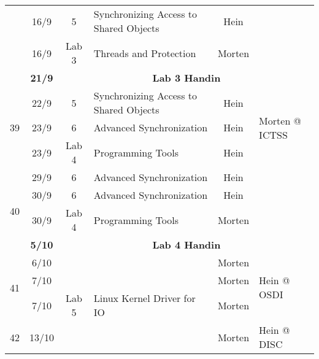 \begin{table}[h]
\begin{tabular}{ccclcl}
                    & 16/9           & 5                & Synchronizing Access to Shared Objects & Hein             &                                 \\
                    & 16/9           & Lab 3            & Threads and Protection                 & Morten           &                                 \\
                    & \textbf{21/9}  & \multicolumn{4}{c}{\textbf{Lab 3 Handin}}                                                                      \\
\multirow{3}{*}{39} & 22/9           & 5                & Synchronizing Access to Shared Objects & Hein             & \multirow{3}{*}{Morten @ ICTSS} \\
                    & 23/9           & 6                & Advanced Synchronization               & Hein             &                                 \\
                    & 23/9           & Lab 4            & Programming Tools                      & Hein             &                                 \\
\multirow{4}{*}{40} & 29/9           & 6                & Advanced Synchronization               & Hein             &                                 \\
                    & 30/9           & 6                & Advanced Synchronization               & Hein             &                                 \\
                    & 30/9           & Lab 4            & Programming Tools                      & Morten           &                                 \\
                    & \textbf{5/10}  & \multicolumn{4}{c}{\textbf{Lab 4 Handin}}                                                                      \\
\multirow{3}{*}{41} & 6/10           &                  &                                        & Morten           & \multirow{3}{*}{Hein @ OSDI}    \\
                    & 7/10           &                  &                                        & Morten           &                                 \\
                    & 7/10           & Lab 5            & Linux Kernel Driver for IO             & Morten           &                                 \\
\multirow{3}{*}{42} & 13/10          &                  &                                        & Morten           & \multirow{3}{*}{Hein @ DISC}    \\

\end{tabular}
\end{table}
